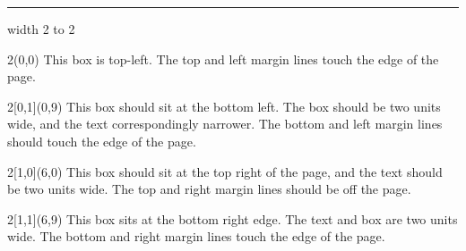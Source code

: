\documentclass{minimal}
\begin{document}
%
\TPMargin{5mm}%

\null\vskip 4cm
\noindent \hrule width 2\TPHorizModule
\smallskip
\hbox to 2

\begin{textblock}{2}(0,0)
  This box is top-left.
  The top and left margin lines touch the edge of the page.
\end{textblock}

\begin{textblock}{2}[0,1](0,9)
  This box should sit at the bottom left.
  The box should be two units wide, and the text correspondingly narrower.
  The bottom and left margin lines should touch the edge of the page.
\end{textblock}

\TPMargin*{5mm}
\begin{textblock}{2}[1,0](6,0)
  This box should sit at the top right of the page, and the text
  should be two units wide.  The top and right margin lines should be
  off the page.
\end{textblock}

\TPMargin{0mm}%
\begin{textblock}{2}[1,1](6,9)
  This box sits at the bottom right edge.
  The text and box are two units wide.
  The bottom and right margin lines touch the edge of the page.
\end{textblock}
\end{document}
